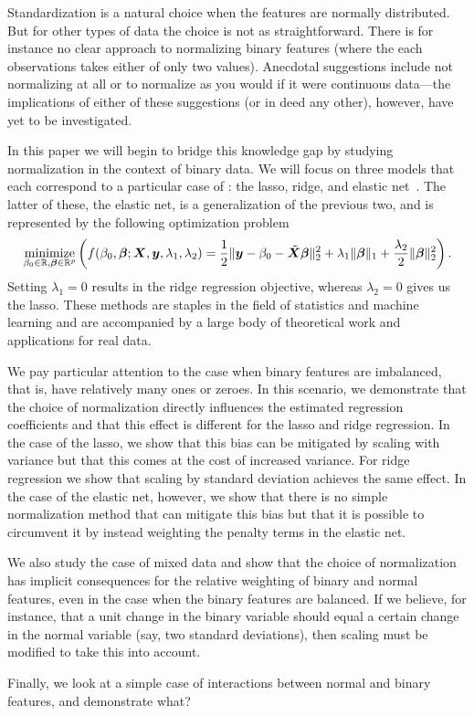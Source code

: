 Standardization is a natural choice when the features are normally distributed. But for
other types of data the choice is not as straightforward. There is for instance no clear
approach to normalizing binary features (where the each observations takes either of only
two values). Anecdotal suggestions include not normalizing at all or to normalize as you
would if it were continuous data---the implications of either of these suggestions (or in
deed any other), however, have yet to be investigated.

In this paper we will begin to bridge this knowledge gap by studying normalization in the
context of binary data. We will focus on three models that each correspond to a particular
case of : the lasso, ridge, and elastic net~\citep{zou2005}. The
latter of these, the elastic net, is a generalization of the previous two, and is
represented by the following optimization problem
%
\begin{equation}
  \label{eq:elastic-net}
  \operatorname*{minimize}_{\beta_0 \in \mathbb{R},\boldsymbol{\beta} \in \mathbb{R}^p}\left( f(\beta_0, \boldsymbol{\beta};\boldsymbol{X},\boldsymbol{y},\lambda_1,\lambda_2)=\frac{1}{2} \lVert \boldsymbol y - \beta_0 - \tilde{\boldsymbol{X}}\boldsymbol{\beta} \rVert^2_2  + \lambda_1 \lVert \boldsymbol\beta \rVert_1 + \frac{\lambda_2}{2}\lVert \boldsymbol \beta \rVert_2^2\right).
\end{equation}
%
Setting \(\lambda_1 = 0\) results in the ridge regression objective, whereas \(\lambda_2 =
0\) gives us the lasso. These methods are staples in the field of statistics and machine
learning and are accompanied by a large body of theoretical work and applications for real
data.

We pay particular attention to the case when binary features are imbalanced, that is, have
relatively many ones or zeroes. In this scenario, we demonstrate that the choice of
normalization directly influences the estimated regression coefficients and that this
effect is different for the lasso and ridge regression. In the case of the lasso, we show
that this bias can be mitigated by scaling with variance but that this comes at the cost of
increased variance. For ridge regression we show that scaling by standard deviation
achieves the same effect. In the case of the elastic net, however, we show that there is no
simple normalization method that can mitigate this bias but that it is possible to
circumvent it by instead weighting the penalty terms in the elastic net.

We also study the case of mixed data and show that the choice of normalization has implicit
consequences for the relative weighting of binary and normal features, even in the case
when the binary features are balanced. If we believe, for instance, that a unit change in
the binary variable should equal a certain change in the normal variable (say, two standard
deviations), then scaling must be modified to take this into account.

Finally, we look at a simple case of interactions between normal and binary features, and
demonstrate what?

